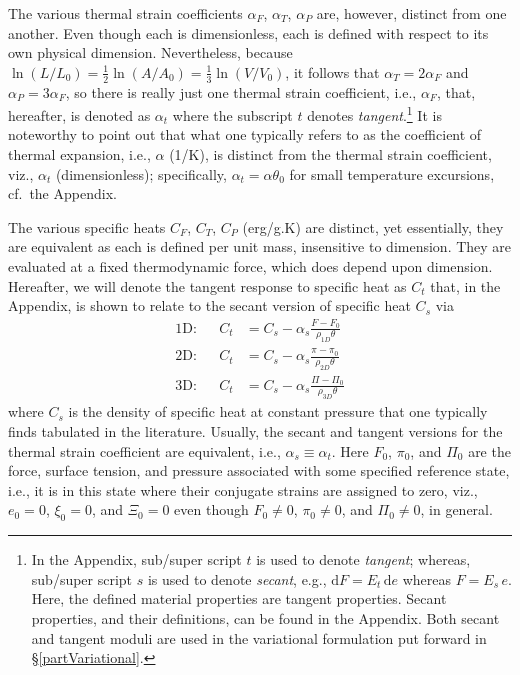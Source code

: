 The various thermal strain coefficients $\alpha_F$, $\alpha_T$, $\alpha_P$ are, however, distinct from one another.  Even though each is dimensionless, each is defined with respect to its own physical dimension.  Nevertheless, because $\ln(L / L_0) = \tfrac{1}{2} \ln (A / \! A_0) = \tfrac{1}{3} \ln (V \! / V_0)$, it follows that $\alpha_T = 2 \alpha_F$ and $\alpha_P = 3 \alpha_F$, so there is really just one thermal strain coefficient, i.e., $\alpha_F$, that, hereafter, is denoted as $\alpha_t$ where the subscript $t$ denotes \textit{tangent}.\footnote{
    In the Appendix, sub\slash super script $t$ is used to denote \textit{tangent\/}; whereas, sub\slash super script $s$ is used to denote \textit{secant}, e.g., $\mathrm{d}F = E_t \, \mathrm{d} e$ whereas $F = E_s \, e$.  Here, the defined material properties are tangent properties.  Secant properties, and their definitions, can be found in the Appendix.  Both secant and tangent moduli are used in the variational formulation put forward in \S\ref{partVariational}.
}
It is noteworthy to point out that what one typically refers to as the coefficient of thermal expansion, i.e., $\alpha$ (1/K), is distinct from the thermal strain coefficient, viz., $\alpha_t$ (dimensionless); specifically, $\alpha_t = \alpha \theta_0$ for small temperature excursions, cf.\ the Appendix.

The various specific heats $C_F$, $C_T$, $C_P$ (erg/g.K) are distinct, yet essentially, they are equivalent as each is defined per unit mass, insensitive to dimension.  They are evaluated at a fixed thermo\-dynamic force, which does depend upon dimension.  Hereafter, we will denote the tangent response to specific heat as $C_t$ that, in the Appendix, is shown to relate to the secant version of specific heat $C_s$ via
\begin{subequations}
    \label{specificHeats}
    \begin{align}
    \text{1D:} & &
    C_t & = C_s - \alpha_s \frac{F - F_0}{\rho_{1D} \theta} \\ 
    \text{2D:} & &
    C_t & = C_s - \alpha_s \frac{\pi - \pi_0}{\rho_{2D} \theta} \\
    \text{3D:} & &
    C_t & = C_s - \alpha_s \frac{\Pi - \Pi_0}{\rho_{3D} \theta}
    \end{align}
\end{subequations}
where $C_s$ is the density of specific heat at constant pressure that one typically finds tabulated in the literature. Usually, the secant and tangent versions for the thermal strain coefficient are equivalent, i.e., $\alpha_s \equiv \alpha_t$.  Here $F_0$, $\pi_0$, and $\Pi_0$ are the force, surface tension, and pressure associated with some specified reference state, i.e., it is in this state where their conjugate strains are assigned to zero, viz., $e_0 = 0$, $\xi_0 = 0$, and $\Xi_0 = 0$ even though $F_0 \neq 0$, $\pi_0 \neq 0$, and $\Pi_0 \neq 0$, in general.

